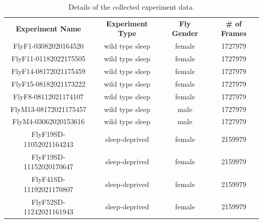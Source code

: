 \begin{table}[htb!]
	\begin{adjustbox}{width=1\textwidth}
		\begin{tabular}{c c c c}
			\toprule
			\multicolumn{1}{c}{\textbf{Experiment Name}} & \multicolumn{1}{c}{\textbf{Experiment Type}} & \multicolumn{1}{c}{\textbf{Fly Gender}} & \multicolumn{1}{c}{\textbf{\# of Frames}} \\
			\cmidrule(lr){1-1}\cmidrule(lr){2-2}\cmidrule(lr){3-3}\cmidrule(lr){4-4}
			FlyF1-03082020164520                         & wild type sleep                              & female                                  & 1727979                                   \\
			FlyF11-01182022175505                        & wild type sleep                              & female                                  & 1727979                                   \\
			FlyF14-08172021175459                        & wild type sleep                              & female                                  & 1727979                                   \\
			FlyF15-08182021173222                        & wild type sleep                              & female                                  & 1727979                                   \\
			FlyF8-08112021174107                         & wild type sleep                              & female                                  & 1727979                                   \\
			FlyM13-08172021175457                        & wild type sleep                              & male                                    & 1727979                                   \\
			FlyM4-03062020153616                         & wild type sleep                              & male                                    & 1727979                                   \\
			FlyF19SD-11052021164243                      & sleep-deprived                               & female                                  & 2159979                                   \\
			FlyF19SD-11152020170647                      & sleep-deprived                               & female                                  & 2159979                                   \\
			FlyF41SD-11192021170807                      & sleep-deprived                               & female                                  & 2159979                                   \\
			FlyF52SD-11242021161943                      & sleep-deprived                               & female                                  & 2159979                                   \\
			\bottomrule
		\end{tabular}
	\end{adjustbox}
	\caption{Details of the collected experiment data. \label{table:experiment-details}}
\end{table}

